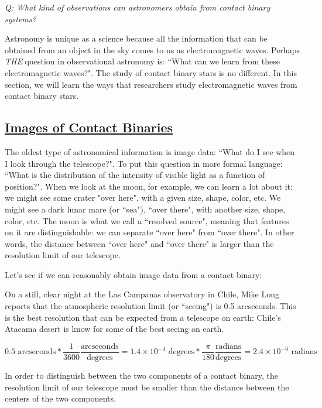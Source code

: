 \documentclass[12pt]{article} %
\numberwithin{equation}{section} %
\begin{document}
\emph{Q: What kind of observations can astronomers obtain from contact binary systems?}

Astronomy is unique as a science because all the information that can be obtained from an object in the sky comes to us as electromagnetic waves. Perhaps \emph{THE} question in observational astronomy is: ``What can we learn from these electromagnetic waves?". The study of contact binary stars is no different. In this section, we will learn the ways that researchers study electromagnetic waves from contact binary stars.

\subsection[Images of Contact Binaries]{\hyperlink{toc}{Images of Contact Binaries}} \label{sec: Images of Contact Binaries}

The oldest type of astronomical information is image data: ``What do I see when I look through the telescope?". To put this question in more formal language: ``What is the distribution of the intensity of visible light as a function of position?". When we look at the moon, for example, we can learn a lot about it: we might see some crater "over here", with a given size, shape, color, etc. We might see a dark lunar mare (or ``sea"), ``over there", with another size, shape, color, etc. The moon is what we call a ``resolved source", meaning that features on it are distinguishable: we can separate ``over here" from ``over there". In other words, the distance between ``over here" and ``over there" is larger than the resolution limit of our telescope.

Let's see if we can reasonably obtain image data from a contact binary:

On a still, clear night at the Las Campanas observatory in Chile, Mike Long reports that the atmospheric resolution limit (or ``seeing") is 0.5 arcseconds. This is the best resolution that can be expected from a telescope on earth: Chile's Atacama desert is know for some of the best seeing on earth.

\begin{equation} \label{eqn: arcseconds}
0.5 \text{ arcseconds} * \frac{1}{3600} \frac{\text{arcseconds}}{\text{degrees}} = 1.4 \times 10^{-4} \text{ degrees} * \frac{\pi}{180} \frac{\text{radians}}{\text{degrees}} = 2.4 \times 10^{-6} \text{ radians}
\end{equation}

In order to distinguish between the two components of a contact binary, the resolution limit of our telescope must be smaller than the distance between the centers of the two components. 
\end{document}
